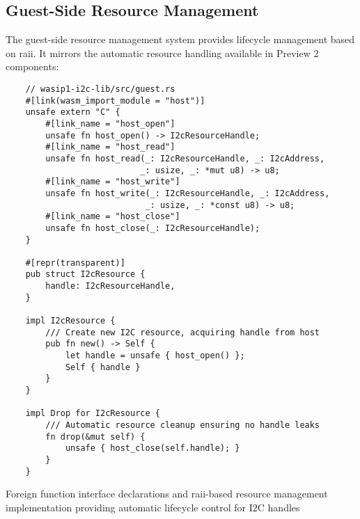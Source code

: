 \subsection{Guest-Side Resource Management}

The guest-side resource management system provides lifecycle management based on \acrfull{raii}. It mirrors the automatic resource handling available in Preview 2 components:

\begin{listing}[H]
    \begin{verbatim}
    // wasip1-i2c-lib/src/guest.rs
    #[link(wasm_import_module = "host")]
    unsafe extern "C" {
        #[link_name = "host_open"]
        unsafe fn host_open() -> I2cResourceHandle;
        #[link_name = "host_read"]
        unsafe fn host_read(_: I2cResourceHandle, _: I2cAddress, 
                           _: usize, _: *mut u8) -> u8;
        #[link_name = "host_write"]
        unsafe fn host_write(_: I2cResourceHandle, _: I2cAddress, 
                            _: usize, _: *const u8) -> u8;
        #[link_name = "host_close"]
        unsafe fn host_close(_: I2cResourceHandle);
    }
    
    #[repr(transparent)]
    pub struct I2cResource {
        handle: I2cResourceHandle,
    }

    impl I2cResource {
        /// Create new I2C resource, acquiring handle from host
        pub fn new() -> Self {
            let handle = unsafe { host_open() };
            Self { handle }
        }
    }
    
    impl Drop for I2cResource {
        /// Automatic resource cleanup ensuring no handle leaks
        fn drop(&mut self) {
            unsafe { host_close(self.handle); }
        }
    }
    \end{verbatim}
    \caption{Foreign function interface declarations and \acrshort{raii}-based resource management implementation providing automatic lifecycle control for I2C handles}
    \label{lst:guest-ffi-declarations}
\end{listing}

